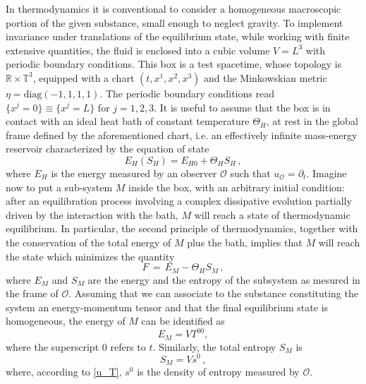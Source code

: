 \documentclass[usenatbib]{mnras}
\begin{document}
In thermodynamics it is conventional to consider a homogeneous macroscopic portion of the given substance, small enough to neglect gravity. To implement invariance under translations of the equilibrium state, while working with finite extensive quantities, the fluid is enclosed into a cubic volume $V=L^3$ with periodic boundary conditions. This box is a test spacetime, whose topology is $ \mathbb{R} \times \mathbb{T}^3 $, equipped with a chart $(t,x^1,x^2,x^3)$ and the Minkowskian metric $\eta=\text{diag}(-1,1,1,1)$.
%
%
The periodic boundary conditions read $\{ x^j =0 \} \equiv \{ x^j =L \}$ for $j=1,2,3$.
It is useful to assume that the box is in contact with an ideal heat bath of constant temperature $\Theta_H$, at rest in the global frame defined by the aforementioned chart, i.e. an effectively infinite mass-energy reservoir characterized by the equation of state
%
\begin{equation}
E_H (S_H) = E_{H0} + \Theta_H S_H \, ,
\end{equation}
%
where $E_H$ is the energy measured by an observer $\mathcal{O}$ such that $u_{\mathcal{O}}=\partial_t$. 
Imagine now to put a sub-system $M$ inside the box, with an arbitrary initial condition: after an equilibration process involving a complex dissipative evolution partially driven by the interaction with the bath, $M$ will reach a state of thermodynamic equilibrium. In particular, the second principle of thermodynamics, together with the conservation of the total energy of $M$ plus the bath, implies that $M$ will reach the state which minimizes the quantity
%
\begin{equation}\label{dacapoancoraallinizio}
F \, = \, E_M - \Theta_H S_M \, ,
\end{equation}
%
where $E_M$ and $S_M$ are the energy and the entropy of the subsystem as mesured in the frame of  $\mathcal{O}$. Assuming that we can associate to the substance constituting the system an energy-momentum tensor and that the final equilibrium state is homogeneous, the energy of $M$ can be identified as 
%
\begin{equation}
\label{belloo}
E_M = V T^{00},
\end{equation}
%
where the superscript $0$ refers to $t$. Similarly, the total entropy $S_M$ is 
%
\begin{equation}
\label{bello}
S_M = Vs^0 \, ,
\end{equation}
%
where, according to \eqref{u_T}, $s^0$ is the density of entropy measured by $\mathcal{O}$.
\end{document}
